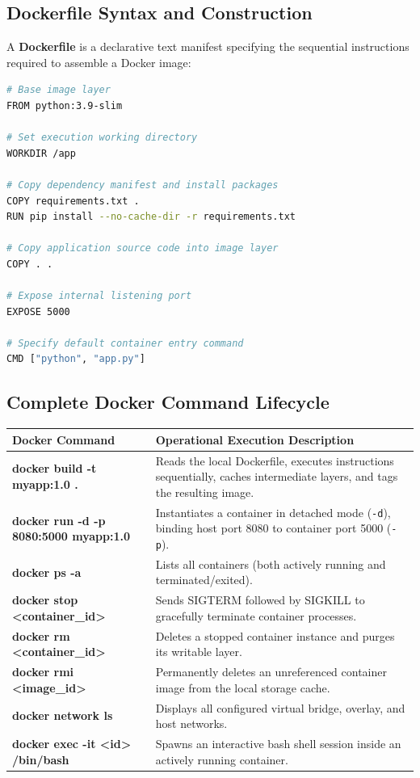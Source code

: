 \documentclass[11pt,a4paper,openany]{report}
\begin{document}
\subsection{Dockerfile Syntax and Construction}
A \textbf{Dockerfile} is a declarative text manifest specifying the sequential instructions required to assemble a Docker image:
\begin{lstlisting}[language=bash]
# Base image layer
FROM python:3.9-slim

# Set execution working directory
WORKDIR /app

# Copy dependency manifest and install packages
COPY requirements.txt .
RUN pip install --no-cache-dir -r requirements.txt

# Copy application source code into image layer
COPY . .

# Expose internal listening port
EXPOSE 5000

# Specify default container entry command
CMD ["python", "app.py"]
\end{lstlisting}

\subsection{Complete Docker Command Lifecycle}
\begin{center}
\begin{tabularx}{\textwidth}{>{\bfseries\ttfamily}l X}
\toprule
Docker Command & Operational Execution Description\\
\midrule
docker build -t myapp:1.0 . & Reads the local Dockerfile, executes instructions sequentially, caches intermediate layers, and tags the resulting image.\\
docker run -d -p 8080:5000 myapp:1.0 & Instantiates a container in detached mode (\texttt{-d}), binding host port 8080 to container port 5000 (\texttt{-p}).\\
docker ps -a & Lists all containers (both actively running and terminated/exited).\\
docker stop <container\_id> & Sends SIGTERM followed by SIGKILL to gracefully terminate container processes.\\
docker rm <container\_id> & Deletes a stopped container instance and purges its writable layer.\\
docker rmi <image\_id> & Permanently deletes an unreferenced container image from the local storage cache.\\
docker network ls & Displays all configured virtual bridge, overlay, and host networks.\\
docker exec -it <id> /bin/bash & Spawns an interactive bash shell session inside an actively running container.\\
\bottomrule
\end{tabularx}
\end{center}
\end{document}
